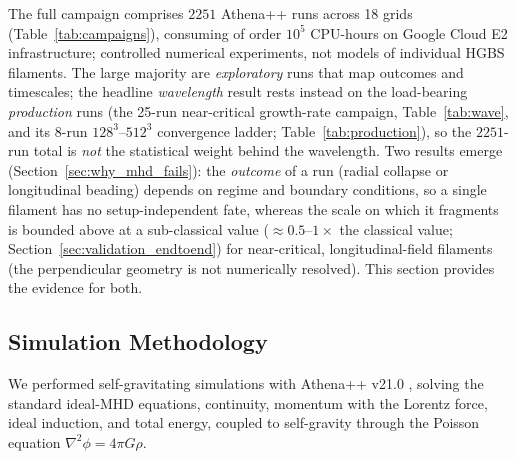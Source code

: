\documentclass[usenatbib,twoside,twocolumn]{mnras}
\begin{document}
The full campaign comprises $2251$ Athena++ runs across 18 grids (Table~\ref{tab:campaigns}), consuming of order $10^5$ CPU-hours on Google Cloud E2 infrastructure; controlled numerical experiments, not models of individual HGBS filaments. The large majority are \emph{exploratory} runs that map outcomes and timescales; the headline \emph{wavelength} result rests instead on the load-bearing \emph{production} runs (the 25-run near-critical growth-rate campaign, Table~\ref{tab:wave}, and its 8-run $128^3$--$512^3$ convergence ladder; Table~\ref{tab:production}), so the $2251$-run total is \emph{not} the statistical weight behind the wavelength. Two results emerge (Section~\ref{sec:why_mhd_fails}): the \emph{outcome} of a run (radial collapse or longitudinal beading) depends on regime and boundary conditions, so a single filament has no setup-independent fate, whereas the scale on which it fragments is bounded above at a sub-classical value ($\approx0.5$--$1\times$ the classical value; Section~\ref{sec:validation_endtoend}) for near-critical, longitudinal-field filaments (the perpendicular geometry is not numerically resolved). This section provides the evidence for both.

\subsection{Simulation Methodology}

We performed self-gravitating simulations with Athena++ v21.0 \citep{Stone2020}, solving the standard ideal-MHD equations, continuity, momentum with the Lorentz force, ideal induction, and total energy, coupled to self-gravity through the Poisson equation $\nabla^2\phi=4\pi G\rho$.
\end{document}
